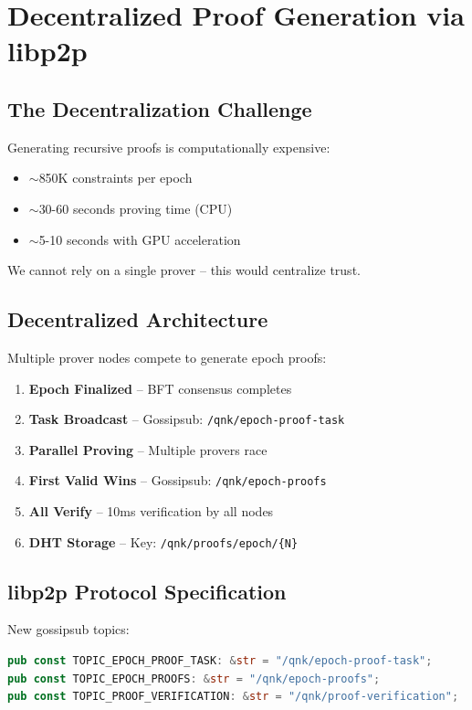\documentclass[11pt,a4paper]{article}
\begin{document}
\section{Decentralized Proof Generation via libp2p}

\subsection{The Decentralization Challenge}

Generating recursive proofs is computationally expensive:
\begin{itemize}
    \item $\sim$850K constraints per epoch
    \item $\sim$30-60 seconds proving time (CPU)
    \item $\sim$5-10 seconds with GPU acceleration
\end{itemize}

We cannot rely on a single prover -- this would centralize trust.

\subsection{Decentralized Architecture}

Multiple prover nodes compete to generate epoch proofs:

\begin{enumerate}
    \item \textbf{Epoch Finalized} -- BFT consensus completes
    \item \textbf{Task Broadcast} -- Gossipsub: \texttt{/qnk/epoch-proof-task}
    \item \textbf{Parallel Proving} -- Multiple provers race
    \item \textbf{First Valid Wins} -- Gossipsub: \texttt{/qnk/epoch-proofs}
    \item \textbf{All Verify} -- 10ms verification by all nodes
    \item \textbf{DHT Storage} -- Key: \texttt{/qnk/proofs/epoch/\{N\}}
\end{enumerate}

\subsection{libp2p Protocol Specification}

New gossipsub topics:
\begin{lstlisting}[language=Rust]
pub const TOPIC_EPOCH_PROOF_TASK: &str = "/qnk/epoch-proof-task";
pub const TOPIC_EPOCH_PROOFS: &str = "/qnk/epoch-proofs";
pub const TOPIC_PROOF_VERIFICATION: &str = "/qnk/proof-verification";
\end{lstlisting}
\end{document}
